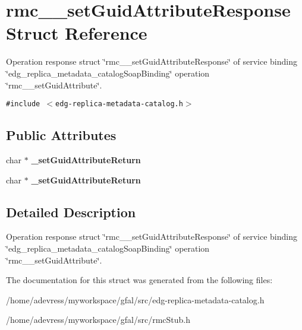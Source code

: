 \section{rmc\_\-\_\-set\-Guid\-Attribute\-Response Struct Reference}
\label{structrmc____setGuidAttributeResponse}
Operation response struct \char`\"{}rmc\_\-\_\-set\-Guid\-Attribute\-Response\char`\"{} of service binding \char`\"{}edg\_\-replica\_\-metadata\_\-catalog\-Soap\-Binding\char`\"{} operation \char`\"{}rmc\_\-\_\-set\-Guid\-Attribute\char`\"{}.  


{\tt \#include $<$edg-replica-metadata-catalog.h$>$}

\subsection*{Public Attributes}
\begin{CompactItemize}
\item 
char $\ast$ \textbf{\_\-set\-Guid\-Attribute\-Return}\label{structrmc____setGuidAttributeResponse_9487907589554c0e04d5dee876ee78b8}

\item 
char $\ast$ \textbf{\_\-set\-Guid\-Attribute\-Return}\label{structrmc____setGuidAttributeResponse_9487907589554c0e04d5dee876ee78b8}

\end{CompactItemize}


\subsection{Detailed Description}
Operation response struct \char`\"{}rmc\_\-\_\-set\-Guid\-Attribute\-Response\char`\"{} of service binding \char`\"{}edg\_\-replica\_\-metadata\_\-catalog\-Soap\-Binding\char`\"{} operation \char`\"{}rmc\_\-\_\-set\-Guid\-Attribute\char`\"{}. 



The documentation for this struct was generated from the following files:\begin{CompactItemize}
\item 
/home/adevress/myworkspace/gfal/src/edg-replica-metadata-catalog.h\item 
/home/adevress/myworkspace/gfal/src/rmc\-Stub.h\end{CompactItemize}
